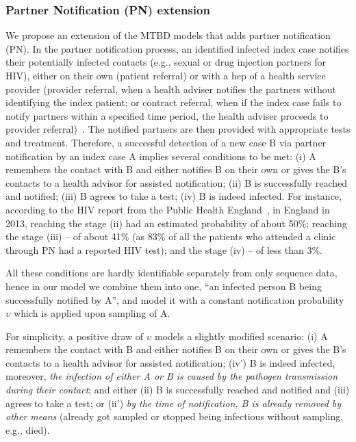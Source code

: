 \documentclass[10pt,letterpaper]{article}
\begin{document}
\subsubsection*{Partner Notification (PN) extension}

We propose an %
extension of the MTBD models that adds partner notification (PN).  
In the partner notification process, an identified infected index case notifies their potentially infected contacts (e.g., sexual or drug injection partners for HIV), either on their own (patient referral) or with a hep of a health service provider (provider referral, when a health adviser notifies the partners without identifying the index patient; or contract referral, when if the index case fails to notify partners within a specified time period, the health adviser proceeds to provider referral)~\cite{wardPartnerNotification2014}. The notified partners are then provided with appropriate tests and treatment. Therefore, a successful detection of a new case B via partner notification by an index case A implies several conditions to be met: (i) A remembers the contact with B and  either notifies B on their own or gives the B's contacts to a health advisor for assisted notification; (ii) B is successfully reached and notified; (iii) B agrees to take a test; (iv) B is indeed infected. 
For instance, according to the HIV report from the Public Health England~\cite{aHIVUnitedKingdom2014}, in England in 2013, reaching the stage (ii) had an estimated probability of about 50\%; reaching the stage (iii) -- of about 41\% (as 83\% of all the patients who attended a clinic through PN had a reported HIV test); and the stage (iv) -- of less than 3\%.

All these conditions are hardly identifiable separately from only sequence data, hence in our model we combine them into one, ``an infected person B being successfully notified by A'', and model it with a constant notification probability $\upsilon$ which is applied upon sampling of A. 

For simplicity, a positive draw of $\upsilon$ models a slightly modified scenario: (i) A remembers the contact with B and  either notifies B on their own or gives the B's contacts to a health advisor for assisted notification; (iv') B is indeed infected, moreover, \textit{the infection of either A or B is caused by the pathogen transmission during their contact};  and either (ii) B is successfully reached and notified and (iii) agrees to take a test; or (ii') \textit{by the time of notification, B is already removed by other means} (already got sampled or stopped being infectious without sampling, e.g., died).
\end{document}
